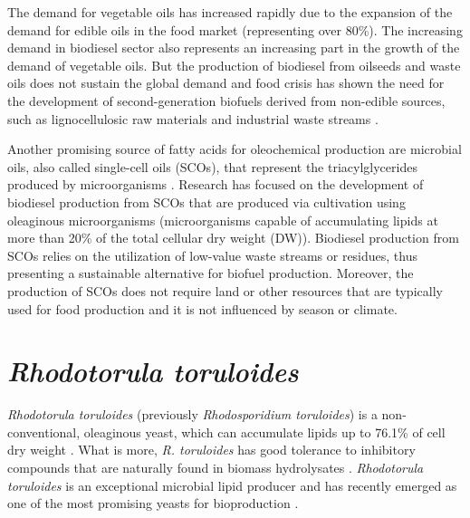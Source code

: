 
The demand for vegetable oils has increased rapidly due to the expansion
of the demand for edible oils in the food market (representing over 80\%).
The increasing demand in biodiesel sector also represents an increasing part in the growth of the demand of vegetable oils. \cite{rosillo2009global}
But the production of biodiesel from oilseeds and waste oils does not sustain the 
global demand \cite{Koutinas2014} and food crisis has shown the 
need for the development of second-generation biofuels derived from non-edible sources, 
such as lignocellulosic raw materials and industrial waste streams \cite{Koutinas2011}.

Another promising source of fatty acids for oleochemical production are microbial oils, also called single-cell oils (SCOs), that represent
the triacylglycerides produced by microorganisms \cite{Adrio2017}.
Research has focused on the development 
of biodiesel production from SCOs that are produced via cultivation using oleaginous microorganisms (microorganisms 
capable of accumulating lipids at more than 20\% of the total cellular dry weight (DW)). Biodiesel production from SCOs relies on the utilization of low-value waste streams or residues, thus presenting a sustainable alternative for biofuel production. Moreover, the production of SCOs does not require land or other resources that are typically used for food production and it is not influenced by season or climate. \cite{Koutinas2014} 

\section{\textit{Rhodotorula toruloides}} %

\textit{Rhodotorula toruloides} (previously \textit{Rhodosporidium toruloides}) is a non-conventional, oleaginous yeast,
which can accumulate lipids up to 76.1\% of cell dry weight \cite{Li2007}. 
What is more, \textit{R. toruloides} has good tolerance to inhibitory compounds that are naturally found in biomass hydrolysates \cite{Hu2009, Bonturi2017}.
\textit{Rhodotorula toruloides} is an exceptional microbial lipid producer and has recently emerged as one of the most promising yeasts for bioproduction \cite{Wu2023, Park2018}.

